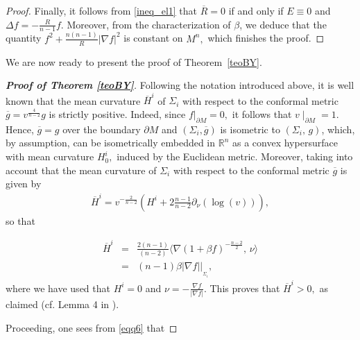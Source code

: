 \documentclass{amsart}
\numberwithin{equation}{section}
\begin{document}
\begin{proof}
		Finally, it follows from \eqref{ineq_el1} that ${\overline{R}}=0$ if and only if $E\equiv 0$ and $\Delta f=-\frac{R}{n-1}f$.  Moreover, from the characterization of $\beta$, we deduce that the quantity $f^2+\frac{n(n-1)}{R}|\nabla f|^2$ is constant on $M^n,$ which finishes the proof. 
\end{proof}


	
	We are now ready to present the proof of Theorem~\ref{teoBY}.
	
	
	
	
	\begin{proof}[{\bf Proof of Theorem \ref{teoBY}}]
Following the notation introduced above, it is well known that the mean curvature $\overline{H}^{i}$ of $\Sigma_i$ with respect to the conformal metric $\overline{g}=v^{\frac{4}{n-2}}g$ is strictly positive. Indeed, since $f|_{\partial M}=0,$ it follows that $v\mid_{\partial M}=1.$ Hence, $\overline{g}=g$ over the boundary $\partial M$ and $(\Sigma_i,\overline{g})$ is isometric to $(\Sigma_{i},\,g)$, which, by assumption, can be isometrically embedded in $\mathbb{R}^n$ as a convex hypersurface with mean curvature  $H_{0}^{i},$ induced by the Euclidean metric. Moreover, taking into account that the mean curvature of $\Sigma_i$ with respect to the conformal metric $\overline{g}$ is given by
		\begin{eqnarray}\label{eqq5}
			\overline{H}^{i}=v^{-\frac{2}{n-2}}\left(H^{i}+2\frac{n-1}{n-2}\partial_\nu(\log(v))\right),
		\end{eqnarray} so that
		
		\begin{eqnarray}
			\label{eqq6}
			\overline{H}^{i}&=& \frac{2(n-1)}{(n-2)}\big\langle \nabla(1+\beta f)^{-\frac{n-2}{2}},\,\nu\big\rangle\nonumber\\
			&=& (n-1)\beta|\nabla f|\Big|_{_{\Sigma_i}},
		\end{eqnarray} where we have used that $H^{i}=0$ and $\nu=-\frac{\nabla f}{|\nabla f|}.$ This proves that $\overline{H}^{i}>0,$ as claimed (cf. Lemma 4 in \cite{tiarlos}). 
		

		
		Proceeding, one sees from \eqref{eqq6} that
		

\end{proof}
\end{document}
